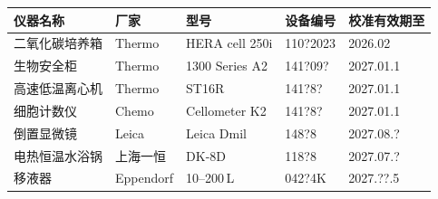 \documentclass[UTF8,10pt,a4paper,fontset=fandol]{ctexart}
\newcommand{\fieldvalue}[1]{#1}
\newcommand{\handwritten}[1]{#1}
\begin{document}
\begin{center}
\small
\begin{tabular}{|p{3.0cm}|p{2.4cm}|p{3.0cm}|p{3.0cm}|p{3.0cm}|}
\hline
仪器名称 & 厂家 & 型号 & 设备编号 & 校准有效期至\\
\hline
二氧化碳培养箱 & Thermo & HERA cell 250i &
\fieldvalue{\handwritten{110?2023}} &
\fieldvalue{\handwritten{2026.02}}\\
\hline
生物安全柜 & Thermo & 1300 Series A2 &
\fieldvalue{\handwritten{141?09?}} &
\fieldvalue{\handwritten{2027.01.1}}\\
\hline
高速低温离心机 & Thermo & ST16R &
\fieldvalue{\handwritten{141?8?}} &
\fieldvalue{\handwritten{2027.01.1}}\\
\hline
细胞计数仪 & Chemo & Cellometer K2 &
\fieldvalue{\handwritten{141?8?}} &
\fieldvalue{\handwritten{2027.01.1}}\\
\hline
倒置显微镜 & Leica & Leica Dmil &
\fieldvalue{\handwritten{148?8}} &
\fieldvalue{\handwritten{2027.08.?}}\\
\hline
电热恒温水浴锅 & 上海一恒 & DK-8D &
\fieldvalue{\handwritten{118?8}} &
\fieldvalue{\handwritten{2027.07.?}}\\
\hline
\multirow{1}{*}{移液器} & \multirow{1}{*}{Eppendorf} &
\fieldvalue{\handwritten{10--200\,\textmu L}} &
\fieldvalue{\handwritten{042?4K}} &
\fieldvalue{\handwritten{2027.??.5}}\\
\hline
\end{tabular}
\end{center}
\end{document}
